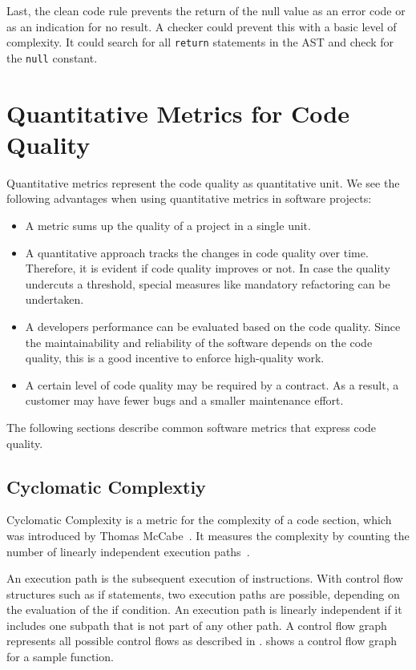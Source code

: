Last, the clean code rule prevents the return of the null value as an error code or as an indication for no result. A checker could prevent this with a basic level of complexity. It could search for all \texttt{return} statements in the AST and check for the \texttt{null} constant.

\section{Quantitative Metrics for Code Quality}
Quantitative metrics represent the code quality as quantitative unit. We see the following advantages when using quantitative metrics in software projects:
\begin{itemize}
    \item A metric sums up the quality of a project in a single unit.
    \item A quantitative approach tracks the changes in code quality over time. Therefore, it is evident if code quality improves or not. In case the quality undercuts a threshold, special measures like mandatory refactoring can be undertaken.
    \item A developers performance can be evaluated based on the code quality. Since the maintainability and reliability of the software depends on the code quality, this is a good incentive to enforce high-quality work.
    \item A certain level of code quality may be required by a contract. As a result, a customer may have fewer bugs and a smaller maintenance effort.
\end{itemize}
The following sections describe common software metrics that express code quality.

\subsection{Cyclomatic Complextiy}\label{sec:cyclomatic_complexity}
Cyclomatic Complexity is a metric for the complexity of a code section, which was introduced by Thomas McCabe~\cite{mccabe_complexity_1976}. It measures the complexity by counting the number of linearly independent execution paths~\cite{mccabe_complexity_1976}. 

An execution path is the subsequent execution of instructions. With control flow structures such as if statements, two execution paths are possible, depending on the evaluation of the if condition. An execution path is linearly independent if it includes one subpath that is not part of any other path. A control flow graph represents all possible control flows as described in .  shows a control flow graph for a sample function.

